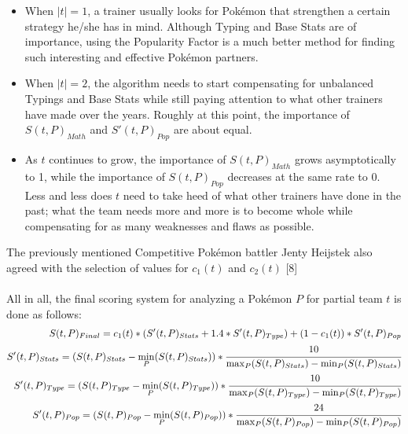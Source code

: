 \documentclass{article}
\begin{document}
\begin{itemize}
	\item When $|t|=1$, a trainer usually looks for Pok\'emon that strengthen a certain strategy he/she has in mind. Although Typing and Base Stats are of importance, using the Popularity Factor is a much better method for finding such interesting and effective Pok\'emon partners.
	\item When $|t|=2$, the algorithm needs to start compensating for unbalanced Typings and Base Stats while still paying attention to what other trainers have made over the years. Roughly at this point, the importance of $S(t,P)_{Math}$ and $S'(t,P)_{Pop}$ are about equal.
	\item As $t$ continues to grow, the importance of $S(t,P)_{Math}$ grows asymptotically to 1, while the importance of $S(t,P)_{Pop}$ decreases at the same rate to 0. Less and less does $t$ need to take heed of what other trainers have done in the past; what the team needs more and more is to become whole while compensating for as many weaknesses and flaws as possible.
\end{itemize}
The previously mentioned Competitive Pok\'emon battler Jenty Heijstek also agreed with the selection of values for $c_1(t)$ and $c_2(t)$ [8]\\\\
All in all, the final scoring system for analyzing a Pok\'emon $P$ for partial team $t$ is done as follows:
\begin{eqnarray*}
	S(t,P)_{Final}=c_1(t)*(S'(t,P)_{Stats}+1.4*S'(t,P)_{Type})+(1-c_1(t))*S'(t,P)_{Pop}\\
	S'(t,P)_{Stats}=(S(t,P)_{Stats}-\min_P(S(t,P)_{Stats}))*\cfrac{10}{\max_P(S(t,P)_{Stats})-\min_P(S(t,P)_{Stats})}\\
	S'(t,P)_{Type}=(S(t,P)_{Type}-\min_P(S(t,P)_{Type}))*\cfrac{10}{\max_P(S(t,P)_{Type})-\min_P(S(t,P)_{Type})}\\
	S'(t,P)_{Pop}=(S(t,P)_{Pop}-\min_P(S(t,P)_{Pop}))*\cfrac{24}{\max_P(S(t,P)_{Pop})-\min_P(S(t,P)_{Pop})}
\end{eqnarray*}
\end{document}
